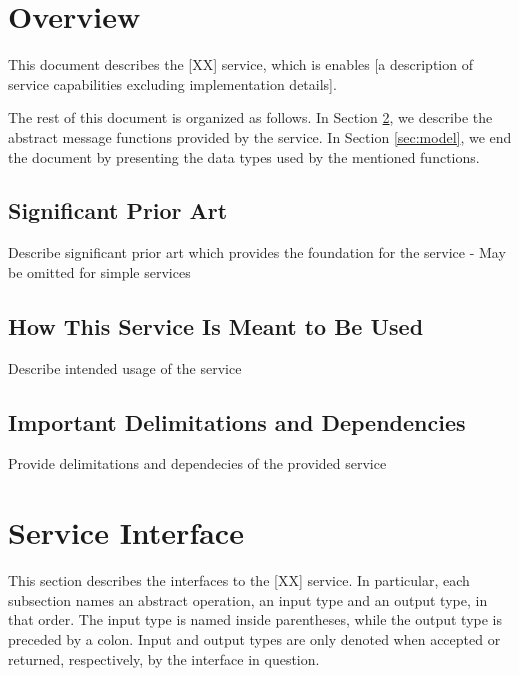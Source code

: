 \documentclass[a4paper]{arrowhead}
\begin{document}
\section{Overview}
\label{sec:overview}
\color{red}
This document describes the [XX] service, which is enables [a description of service capabilities excluding implementation details]. 

The rest of this document is organized as follows.
In Section \ref{sec:functions}, we describe the abstract message functions provided by the service.
In Section \ref{sec:model}, we end the document by presenting the data types used by the mentioned functions.
\color{black}

\newpage

\subsection{Significant Prior Art}

\color{red} Describe significant prior art which provides the
foundation for the service - May be omitted for simple services \color{black}  

\subsection{How This Service Is Meant to Be Used}
\color{red} Describe intended usage of the service \color{black}  


\subsection{Important Delimitations and Dependencies}
\label{sec:delimitations}

\color{red} Provide delimitations and dependecies of the provided service \color{black}  



\newpage

\section{Service Interface}
\label{sec:functions}

\color{red}
This section describes the interfaces to the [XX] service.
In particular, each subsection names an abstract operation, an input type and an output type, in that order.
The input type is named inside parentheses, while the output type is preceded by a colon.
Input and output types are only denoted when accepted or returned, respectively, by the interface in question.
\end{document}
